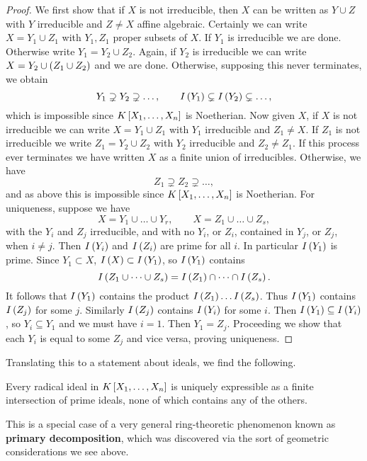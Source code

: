 \begin{proof}
We first show that if $ X $ is not irreducible, then $ X $ can be written as $ Y \cup Z $ with $ Y $ irreducible and $ Z \ne X $ affine algebraic. Certainly we can write $ X = Y_1 \cup Z_1 $ with $ Y_1, Z_1 $ proper subsets of $ X $. If $ Y_1 $ is irreducible we are done. Otherwise write $ Y_1 = Y_2 \cup Z_2 $. Again, if $ Y_2 $ is irreducible we can write $ X = Y_2 \cup \rb{Z_1 \cup Z_2} $ and we are done. Otherwise, supposing this never terminates, we obtain
$$ Y_1 \supsetneq Y_2 \supsetneq \dots, \qquad I\rb{Y_1} \subsetneq I\rb{Y_2} \subsetneq \dots, $$
which is impossible since $ K\sb{X_1, \dots, X_n} $ is Noetherian. Now given $ X $, if $ X $ is not irreducible we can write $ X = Y_1 \cup Z_1 $ with $ Y_1 $ irreducible and $ Z_1 \ne X $. If $ Z_1 $ is not irreducible we write $ Z_1 = Y_2 \cup Z_2 $ with $ Y_2 $ irreducible and $ Z_2 \ne Z_1 $. If this process ever terminates we have written $ X $ as a finite union of irreducibles. Otherwise, we have
$$ Z_1 \supsetneq Z_2 \supsetneq \dots, $$
and as above this is impossible since $ K\sb{X_1, \dots, X_n} $ is Noetherian. For uniqueness, suppose we have
$$ X = Y_1 \cup \dots \cup Y_r, \qquad X = Z_1 \cup \dots \cup Z_s, $$
with the $ Y_i $ and $ Z_j $ irreducible, and with no $ Y_i $, or $ Z_i $, contained in $ Y_j $, or $ Z_j $, when $ i \ne j $. Then $ I\rb{Y_i} $ and $ I\rb{Z_i} $ are prime for all $ i $. In particular $ I\rb{Y_1} $ is prime. Since $ Y_1 \subset X $, $ I\rb{X} \subset I\rb{Y_1} $, so $ I\rb{Y_1} $ contains
$$ I\rb{Z_1 \cup \dots \cup Z_s} = I\rb{Z_1} \cap \dots \cap I\rb{Z_s}. $$
It follows that $ I\rb{Y_1} $ contains the product $ I\rb{Z_1} \dots I\rb{Z_s} $. Thus $ I\rb{Y_1} $ contains $ I\rb{Z_j} $ for some $ j $. Similarly $ I\rb{Z_j} $ contains $ I\rb{Y_i} $ for some $ i $. Then $ I\rb{Y_1} \subseteq I\rb{Y_i} $, so $ Y_i \subseteq Y_1 $ and we must have $ i = 1 $. Then $ Y_1 = Z_j $. Proceeding we show that each $ Y_i $ is equal to some $ Z_j $ and vice versa, proving uniqueness.
\end{proof}

Translating this to a statement about ideals, we find the following.

\begin{corollary}
Every radical ideal in $ K\sb{X_1, \dots, X_n} $ is uniquely expressible as a finite intersection of prime ideals, none of which contains any of the others.
\end{corollary}

This is a special case of a very general ring-theoretic phenomenon known as \textbf{primary decomposition}, which was discovered via the sort of geometric considerations we see above.

